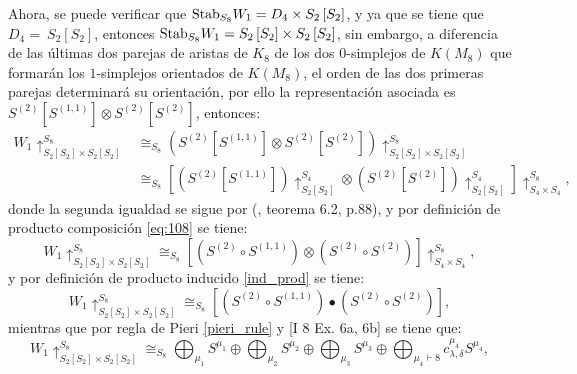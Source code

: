 \documentclass[12pt]{book}
\theoremstyle{definition}
\newcounter{in}
\newcounter{ini}
\begin{document}
Ahora, se puede verificar que $\textup{Stab}_{S_{8}} W_{1} = D_{4} \times
S_{2} \left [ S_{2} \right ]$, y ya que se tiene que $D_{4} =~
S_{2}\left [ S_{2} \right ]$, entonces $\textup{Stab}_{S_{8}} W_{1} =
S_{2} \left [ S_{2} \right ] \times S_{2} \left [ S_{2} \right ]$, sin
embargo, a diferencia de las últimas dos parejas de aristas de $K_{8}$ de los dos $0$-simplejos de $K(M_{8})$ que formarán los $1$-simplejos orientados de $K(M_{8})$, el orden de las dos primeras parejas determinará su orientación, por ello la
representación asociada es $S^{(2)} \left [ S^{(1,1)} \right ] \otimes S^{(2)} \left [ S^{(2)} \right ]$, entonces:
\begin{equation}
\begin{aligned}
W_{1} \uparrow_{S_{2} \left [ S_{2} \right ] \times S_{2} \left [ S_{2} \right ]}^{S_{8}} & \cong_{S_{8}} (S^{(2)} \left [ S^{(1,1)} \right ] \otimes S^{(2)} \left [ S^{(2)} \right ]) \uparrow_{S_{2} \left [ S_{2} \right ] \times S_{2} \left [ S_{2} \right ]}^{S_{8}} \\
& \cong_{S_{8}} \left [ (S^{(2)} \left [ S^{(1,1)} \right ])\uparrow_{S_{2} \left [ S_{2} \right ]}^{S_{4}} \otimes (S^{(2)} \left [ S^{(2)} \right ])\uparrow_{S_{2} \left [ S_{2} \right ]}^{S_{4}} \right ] \uparrow_{S_{4} \times S_{4}}^{S_{8}},
\end{aligned}
\end{equation}
donde la segunda igualdad se sigue por \normalfont(\cite{karpilovsky1990induced}, teorema 6.2, p.88), y por definición de producto composición \ref{eq:108} se tiene:
\begin{equation}
W_{1} \uparrow_{S_{2} \left [ S_{2} \right ] \times S_{2} \left [ S_{2} \right ]}^{S_{8}} \cong_{S_{8}} \left [ (S^{(2)} \circ S^{(1,1)}) \otimes (S^{(2)} \circ S^{(2)})  \right ] \uparrow_{S_{4} \times S_{4}}^{S_{8}},
\end{equation}
y por definición de producto inducido \ref{ind_prod} se tiene:
\begin{equation}
W_{1} \uparrow_{S_{2} \left [ S_{2} \right ] \times S_{2} \left [ S_{2} \right ]}^{S_{8}} \cong_{S_{8}} \left [ (S^{(2)} \circ S^{(1,1)}) \bullet (S^{(2)} \circ S^{(2)})  \right ],
\end{equation}
mientras que por regla de Pieri \ref{pieri_rule} y
\cite{macdonald1998symmetric} [I 8 Ex. 6a, 6b] se tiene que:
\begin{equation}
W_{1} \uparrow_{S_{2} \left [ S_{2} \right ] \times S_{2} \left [ S_{2} \right ]}^{S_{8}} \cong_{S_{8}} \bigoplus_{\mu_{1}} S^{\mu_{1}} \oplus \bigoplus_{\mu_{2}} S^{\mu_{2}} \oplus \bigoplus_{\mu_{3}} S^{\mu_{3}} \oplus \bigoplus_{\mu_{4} \vdash 8} c_{\lambda,\delta}^{\mu_{4}}S^{\mu_{4}},
\end{equation}
\end{document}
